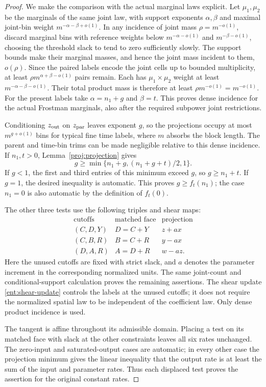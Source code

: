 \begin{proof}
We make the comparison with the actual marginal laws explicit.
Let $\mu_1,\mu_2$ be the marginals of the same joint law, with
support exponents $\alpha,\beta$ and maximal joint-bin weight
$m^{-\alpha-\beta+o(1)}$. In any incidence of joint mass
$\rho=m^{-o(1)}$, discard marginal bins with reference weights
below $m^{-\alpha-o(1)}$ and $m^{-\beta-o(1)}$, choosing the
threshold slack to tend to zero sufficiently slowly. The support
bounds make their marginal masses, and hence the joint mass incident
to them, $o(\rho)$. Since the paired labels encode the joint cells
up to bounded multiplicity, at least
$\rho m^{\alpha+\beta-o(1)}$ pairs remain. Each has
$\mu_1\times\mu_2$ weight at least
$m^{-\alpha-\beta-o(1)}$. Their total product mass is therefore
at least $\rho m^{-o(1)}=m^{-o(1)}$. For the present labels take
$\alpha=n_1+g$ and $\beta=t$. This proves dense incidence for
the actual Frostman marginals, also after the required subpower
joint restrictions.

Conditioning $z_{\rm out}$ on $z_{\rm par}$ leaves exponent $g$,
so the projections occupy at most $m^{g+o(1)}$ bins for typical
fine time labels, where $m$ absorbs the block length. The parent
and time-bin trims can be made negligible relative to this dense
incidence. If $n_1,t>0$,
Lemma~\ref{proj:projection} gives
\[
 g\ge\min\{n_1+g,(n_1+g+t)/2,1\}.
\]
If $g<1$, the first and third entries of this minimum exceed $g$,
so $g\ge n_1+t$. If $g=1$, the desired inequality is automatic.
This proves $g\ge f_t(n_1)$; the case $n_1=0$ is also automatic
by the definition of $f_t(0)$.

The other three tests use the following triples and shear maps:
\[
\begin{array}{c|c|c}
 \text{cutoffs}&\text{matched face}&\text{projection}\\ \hline
 (C,D,Y)&D=C+Y&z+ax\\
 (C,B,R)&B=C+R&y-ax\\
 (D,A,R)&A=D+R&w-az.
\end{array}
\]
Here the unused cutoffs are fixed with strict slack, and $a$ denotes
the parameter increment in the corresponding normalized units. The
same joint-count and conditional-support calculation proves the
remaining assertions. The shear update
\eqref{ent:shear-update} controls the labels at the unused cutoffs; it
does not require the normalized spatial law to be independent of
the coefficient law. Only dense product incidence is used.

The tangent is affine throughout its admissible domain. Placing a
test on its matched face with slack at the other constraints leaves
all six rates unchanged. The zero-input and saturated-output cases
are automatic; in every other case the projection minimum gives the
linear inequality that the output rate is at least the sum of the
input and parameter rates. Thus each displaced test proves the
assertion for the original constant rates.
\end{proof}

